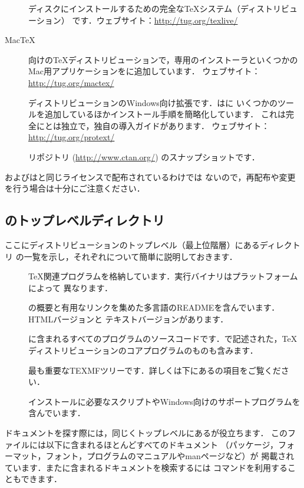 \documentclass[uplatex,dvipdfmx]{jsarticle}
\begin{document}
\begin{description}
\item[\TL]
ディスクにインストールするための完全な\TeX システム（ディストリビューション）
です．ウェブサイト：\url{http://tug.org/texlive/}

\item[Mac\TeX]
\macOS 向けの\TeX ディストリビューションで，専用のインストーラといくつかの
Mac用アプリケーションを\TL に追加しています．
ウェブサイト：\url{http://tug.org/mactex/}

\item[\ProTeXt]
\MIKTEX ディストリビューションのWindows向け拡張です．\ProTeXt は\MIKTEX に
いくつかのツールを追加しているほかインストール手順を簡略化しています．
これは完全に\TL とは独立で，独自の導入ガイドがあります．
ウェブサイト：\url{http://tug.org/protext/}

\item[\CTAN]
\CTAN リポジトリ (\url{http://www.ctan.org/}) のスナップショットです．
\end{description}

\CTAN およびは\TL と同じライセンスで配布されているわけでは
ないので，再配布や変更を行う場合は十分にご注意ください．

\subsection{\TL のトップレベルディレクトリ}
\label{sec:tld}

ここに\TL ディストリビューションのトップレベル（最上位階層）にあるディレクトリ
の一覧を示し，それぞれについて簡単に説明しておきます．
%
\begin{description}
\item[]
\TeX 関連プログラムを格納しています．実行バイナリはプラットフォームによって
異なります．

\item[]
\TL の概要と有用なリンクを集めた多言語のREADMEを含んでいます．HTMLバージョンと
テキストバージョンがあります．

\item[]
\TL に含まれるすべてのプログラムのソースコードです．\Webc で記述された，\TeX
ディストリビューションのコアプログラムのものも含みます．

\item[]
最も重要なTEXMFツリーです．詳しくは下にあるの項目をご覧ください．

\item[]
インストールに必要なスクリプトやWindows向けのサポートプログラムを含んでいます．
\end{description}
%
%
ドキュメントを探す際には，同じくトップレベルにあるが役立ちます．
このファイルには以下に含まれるほとんどすべてのドキュメント
（パッケージ，フォーマット，フォント，プログラムのマニュアルやmanページなど）が
掲載されています．また\TL に含まれるドキュメントを検索するには%
コマンドを利用することもできます．
\end{document}
